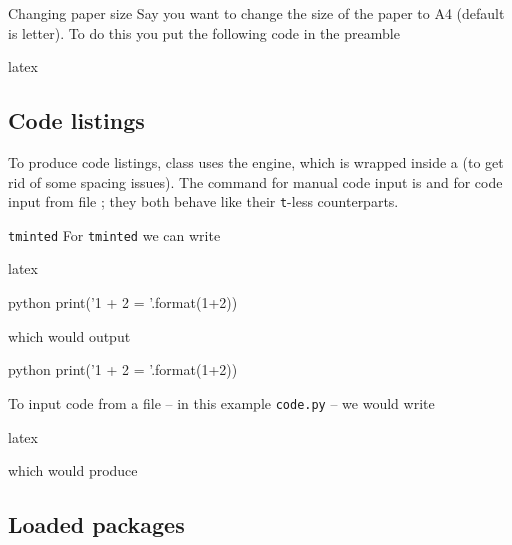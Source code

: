 \documentclass{notes}
\begin{document}
\begin{exm}{Changing paper size}{}
Say you want to change the size of the paper to A4 (default is letter). To do this you put the following code in the preamble

\begin{tminted}{latex}
\geometry{paper=a4paper}
\recalculatemargins
\end{tminted}
\end{exm}

\subsection{Code listings}

To produce code listings, class uses the  engine, which is wrapped inside a  (to get rid of some spacing issues). The command for manual code input is  and for code input from file ; they both behave like their \texttt{t}-less counterparts.

\begin{exm}{\texttt{tminted}}{}
For \texttt{tminted} we can write
\begin{tminted}[escapeinside=||]{latex}
\begin{|tminted|}{python}
    print('1 + 2 = {}'.format(1+2))
\end{|tminted|}
\end{tminted}
which would output
\begin{tminted}{python}
print('1 + 2 = {}'.format(1+2))
\end{tminted}
\end{exm}

To input code from a file -- in this example \texttt{code.py} -- we would write
\begin{tminted}{latex}
\end{tminted}
which would produce

\subsection{Loaded packages}
\end{document}

